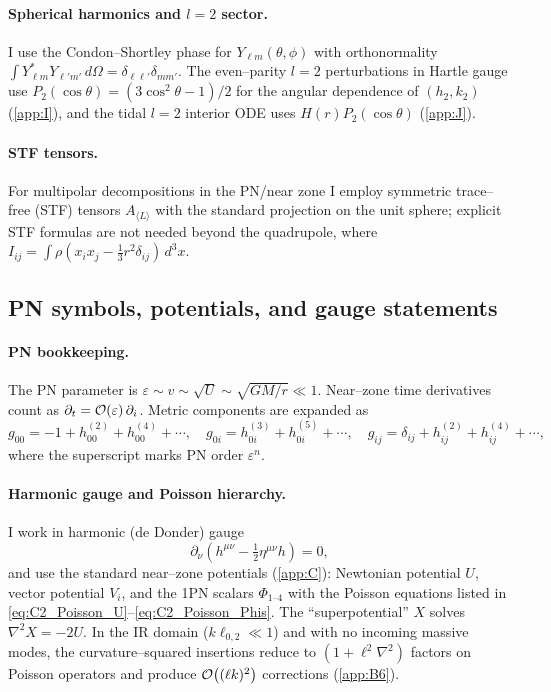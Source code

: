 \documentclass{iopjournal}
\begin{document}
\paragraph{Spherical harmonics and $l=2$ sector.}
I use the Condon–Shortley phase for $Y_{\ell m}(\theta,\phi)$ with orthonormality $\int Y_{\ell m}^{\ast}Y_{\ell' m'}\,d\Omega=\delta_{\ell\ell'}\delta_{mm'}$. The even–parity $l=2$ perturbations in Hartle gauge use $P_2(\cos\theta)=(3\cos^2\theta-1)/2$ for the angular dependence of $(h_2,k_2)$ (\cref{app:I}), and the tidal $l=2$ interior ODE uses $H(r)P_2(\cos\theta)$ (\cref{app:J}).

\paragraph{STF tensors.}
For multipolar decompositions in the PN/near zone I employ symmetric trace–free (STF) tensors $A_{\langle L\rangle}$ with the standard projection on the unit sphere; explicit STF formulas are not needed beyond the quadrupole, where $I_{ij}=\int \rho (x_i x_j-\tfrac{1}{3}r^2\delta_{ij})\,d^3x$.

\subsection{PN symbols, potentials, and gauge statements}\label{app:M3}
\paragraph{PN bookkeeping.}
The PN parameter is $\varepsilon\sim v\sim \sqrt{U}\sim\sqrt{GM/r}\ll1$. Near–zone time derivatives count as $\partial_t=\order{\varepsilon}\,\partial_i$. Metric components are expanded as
\[
g_{00}=-1+h_{00}^{(2)}+h_{00}^{(4)}+\cdots,\quad
g_{0i}=h_{0i}^{(3)}+h_{0i}^{(5)}+\cdots,\quad
g_{ij}=\delta_{ij}+h_{ij}^{(2)}+h_{ij}^{(4)}+\cdots,
\]
where the superscript marks PN order $\varepsilon^n$.

\paragraph{Harmonic gauge and Poisson hierarchy.}
I work in harmonic (de Donder) gauge
\begin{equation}
\partial_\nu\!\left(h^{\mu\nu}-\tfrac12\eta^{\mu\nu}h\right)=0,
\label{eq:M_harmonic}
\end{equation}
and use the standard near–zone potentials (\cref{app:C}): Newtonian potential $U$, vector potential $V_i$, and the 1PN scalars $\Phi_{1\text{--}4}$ with the Poisson equations listed in \eqref{eq:C2_Poisson_U}–\eqref{eq:C2_Poisson_Phis}. The ``superpotential'' $X$ solves $\nabla^2 X=-2U$. In the IR domain ($k\ell_{0,2}\ll1$) and with no incoming massive modes, the curvature–squared insertions reduce to $(1+\ell^2\nabla^2)$ factors on Poisson operators and produce $\order{(\ell k)^2}$ corrections (\cref{app:B6}).
\end{document}
